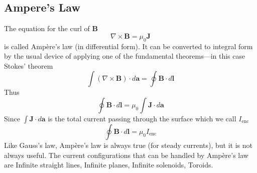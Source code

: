 \documentclass[../../../main.tex]{subfiles}
\begin{document}
\subsection{Ampere's Law}
The equation for the curl of \textbf{B}
\begin{equation*}
    \nabla\times \mathbf{B}=\mu_0 \mathbf{J}
\end{equation*}
is called Ampère’s law (in differential form). It can be converted to integral form by the usual device of applying one of the fundamental theorems—in this case Stokes’ theorem
\begin{equation*}
    \int(\nabla\times \mathbf{B})\cdot d\mathbf{a}=\oint \mathbf{B}\cdot d\mathbf{l}
\end{equation*}
Thus
\begin{equation*}
    \oint \mathbf{B}\cdot d\mathbf{l}=\mu_0\int\mathbf{J} \cdot d\mathbf{a}
\end{equation*}
Since $\int\mathbf{J} \cdot d\mathbf{a}$ is the total current passing through the surface which we call $I_{\text{enc}}$ 
\begin{equation*}
    \oint \mathbf{B}\cdot d\mathbf{l}=\mu_0I_{\text{enc}}
\end{equation*}
Like Gauss’s law, Ampère’s law is always true (for steady currents), but it is not always useful. The current conﬁgurations that can be handled by Ampère’s law are Inﬁnite straight lines, Inﬁnite planes, Inﬁnite solenoids, Toroids. 
\end{document}
